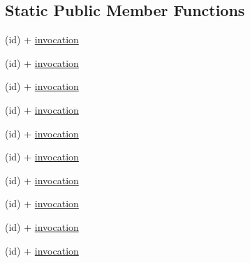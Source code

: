 \subsection*{\-Static \-Public \-Member \-Functions}
\begin{DoxyCompactItemize}
\item 
(id) + \hyperlink{interface_g_h_n_s_invocation_proxy___g_h_u_n_i_t_a479b7ccfc1f68015a1dbe982bd1e02cf}{invocation}
\item 
(id) + \hyperlink{interface_g_h_n_s_invocation_proxy___g_h_u_n_i_t_a479b7ccfc1f68015a1dbe982bd1e02cf}{invocation}
\item 
(id) + \hyperlink{interface_g_h_n_s_invocation_proxy___g_h_u_n_i_t_a479b7ccfc1f68015a1dbe982bd1e02cf}{invocation}
\item 
(id) + \hyperlink{interface_g_h_n_s_invocation_proxy___g_h_u_n_i_t_a479b7ccfc1f68015a1dbe982bd1e02cf}{invocation}
\item 
(id) + \hyperlink{interface_g_h_n_s_invocation_proxy___g_h_u_n_i_t_a479b7ccfc1f68015a1dbe982bd1e02cf}{invocation}
\item 
(id) + \hyperlink{interface_g_h_n_s_invocation_proxy___g_h_u_n_i_t_a479b7ccfc1f68015a1dbe982bd1e02cf}{invocation}
\item 
(id) + \hyperlink{interface_g_h_n_s_invocation_proxy___g_h_u_n_i_t_a479b7ccfc1f68015a1dbe982bd1e02cf}{invocation}
\item 
(id) + \hyperlink{interface_g_h_n_s_invocation_proxy___g_h_u_n_i_t_a479b7ccfc1f68015a1dbe982bd1e02cf}{invocation}
\item 
(id) + \hyperlink{interface_g_h_n_s_invocation_proxy___g_h_u_n_i_t_a479b7ccfc1f68015a1dbe982bd1e02cf}{invocation}
\item 
(id) + \hyperlink{interface_g_h_n_s_invocation_proxy___g_h_u_n_i_t_a479b7ccfc1f68015a1dbe982bd1e02cf}{invocation}
\end{DoxyCompactItemize}
